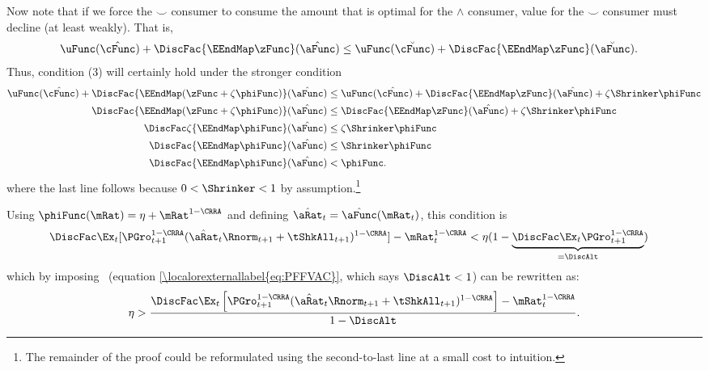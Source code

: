 \documentclass[\econtexRoot/BufferStockTheory]{subfiles}
\begin{document}
Now note that if we force the $\smile$ consumer to consume the amount that is
optimal for the $\wedge$ consumer, value for the $\smile$ consumer must decline (at least weakly).  That is,
\begin{align*}
\uFunc(\hat{\cFunc})+\DiscFac \{\EEndMap \zFunc \}(\hat{\aFunc})  & \leq \uFunc(\breve{\cFunc})+\DiscFac \{\EEndMap \zFunc \}(\breve{\aFunc})
.
\end{align*}
Thus, condition (3) will certainly hold under the stronger condition
\begin{align*}
\uFunc(\hat{\cFunc})+\DiscFac\{\EEndMap (\zFunc+\zeta \phiFunc) \}(\hat{\aFunc})  & \leq  \uFunc(\hat{\cFunc})+\DiscFac\{\EEndMap \zFunc \}(\hat{\aFunc})  + \zeta \Shrinker \phiFunc
\\ \DiscFac\{\EEndMap (\zFunc+\zeta \phiFunc) \}(\hat{\aFunc})  & \leq  \DiscFac\{\EEndMap \zFunc  \}(\hat{\aFunc})  + \zeta \Shrinker \phiFunc
\\ \DiscFac\zeta \{\EEndMap \phiFunc \}(\hat{\aFunc})  & \leq  \zeta \Shrinker \phiFunc
\\ \DiscFac\{\EEndMap \phiFunc \}(\hat{\aFunc})  & \leq  \Shrinker \phiFunc
\\ \DiscFac\{\EEndMap \phiFunc \}(\hat{\aFunc})   & < \phiFunc %
.
\end{align*}
where the last line follows because $0 < \Shrinker < 1$ by assumption.\footnote{The remainder of the proof could be reformulated using the second-to-last line at a small cost to intuition.}

Using $\phiFunc(\mRat)= \eta + \mRat^{1-\CRRA}$
and defining $\hat{\aRat}_{t}=\hat{\aFunc}(\mRat_{t})$, this condition is
\begin{align*}
\DiscFac \Ex_{t}[{\PGro}_{t+1}^{1-\CRRA}(\hat{\aRat}_{t}\Rnorm_{t+1}+\tShkAll_{t+1})^{1-\CRRA}]-\mRat_{t}^{1-\CRRA}  & < \eta(1-\underbrace{\DiscFac\Ex_{t}{\PGro}_{t+1}^{1-\CRRA}}_{=\DiscAlt})
\end{align*}
which by imposing \PFFVAC~(equation \eqref{\localorexternallabel{eq:PFFVAC}}, which says $\DiscAlt<1$) can be rewritten as:
\begin{equation}\begin{gathered}\begin{aligned}
 \eta>\frac{\DiscFac \Ex_{t}\left[{\PGro}_{t+1}^{1-\CRRA}(\hat{\aRat}_{t}\Rnorm_{t+1}+\tShkAll_{t+1})^{1-\CRRA}\right]-\mRat_{t}^{1-\CRRA}}{1-\DiscAlt}\label{eq:KeyCondition}.
\end{aligned}\end{gathered}\end{equation}
\end{document}
